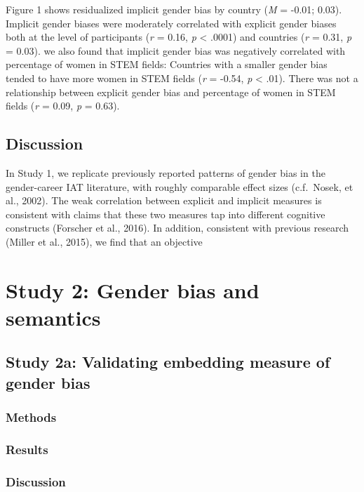 \documentclass[man]{apa6}
\theoremstyle{definition}
\theoremstyle{definition}
\theoremstyle{definition}
\theoremstyle{remark}
\begin{document}
Figure 1 shows residualized implicit gender bias by country (\emph{M} =
-0.01; 0.03). Implicit gender biases were moderately correlated with
explicit gender biases both at the level of participants (\emph{r} =
0.16, \emph{p} \textless{} .0001) and countries (\emph{r} = 0.31,
\emph{p} = 0.03). we also found that implicit gender bias was negatively
correlated with percentage of women in STEM fields: Countries with a
smaller gender bias tended to have more women in STEM fields (\emph{r} =
-0.54, \emph{p} \textless{} .01). There was not a relationship between
explicit gender bias and percentage of women in STEM fields (\emph{r} =
0.09, \emph{p} = 0.63).

\subsection{Discussion}\label{discussion}

In Study 1, we replicate previously reported patterns of gender bias in
the gender-career IAT literature, with roughly comparable effect sizes
(c.f.~Nosek, et al., 2002). The weak correlation between explicit and
implicit measures is consistent with claims that these two measures tap
into different cognitive constructs (Forscher et al., 2016). In
addition, consistent with previous research (Miller et al., 2015), we
find that an objective

\section{Study 2: Gender bias and
semantics}\label{study-2-gender-bias-and-semantics}

\subsection{Study 2a: Validating embedding measure of gender
bias}\label{study-2a-validating-embedding-measure-of-gender-bias}

\subsubsection{Methods}\label{methods-1}

\subsubsection{Results}\label{results-1}

\subsubsection{Discussion}\label{discussion-1}
\end{document}
